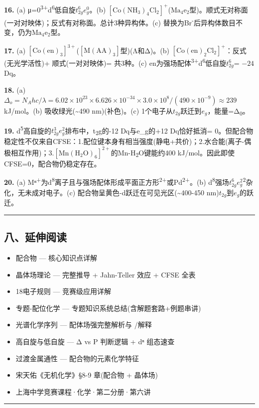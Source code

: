 \textbf{16.} (a) μ=0\textsuperscript{3+}d\textsuperscript{6}低自旋\箭\(t_{2g}^6 e_g^0\)。(b) \(\mathrm{[Co(NH_3)_4Cl_2]^+}\)(\(\mathrm{Ma_4e_2}\)型)。顺式无对称面(一对对映体)；反式有对称面。总计3种异构体。(c) 替换为Br\textsuperscript{-}后异构体数目不变，仍为\(\mathrm{Ma_4e_2}\)型。

\textbf{17.} (a) \(\mathrm{[Co(en)_3]^{3+}}\)(\(\mathrm{[M(AA)_3]}\)型)(Λ和Δ)。(b) \(\mathrm{[Co(en)_2Cl_2]^+}\)：反式(无光学活性)+ 顺式(一对对映体)= 共3种。(c) en为强场配体\textsuperscript{3+}d\textsuperscript{6}低自旋\箭\(t_{2g}^6\) = \(-24\) Dq。

\textbf{18.} (a) \(\Delta_o = N_A hc/\lambda = 6.02 \times 10^{23} \times 6.626 \times 10^{-34} \times 3.0 \times 10^8 / (490 \times 10^{-9}) \approx 239\) kJ/mol。(b) 吸收绿光(\textasciitilde490 nm)(补色)。(c) 1个电子从\(t_{2g}\)跃迁到\(e_g\)，能量=Δ\textsubscript{0}。

\textbf{19.} d\textsuperscript{5}高自旋的\(t_{2g}^3 e_g^2\)排布中，t\textsubscript{2}g的-12 Dq与e\_g的+12 Dq恰好抵消 = 0。但配合物稳定性不仅来自CFSE：1.配位键本身有相当强度(静电+共价)；2.水合能(离子-偶极相互作用)；3.\(\mathrm{[Mn(H_2O)_6]^{2+}}\)的Mn-H\textsubscript{2}O键能约400 kJ/mol。因此即使CFSE=0，配合物仍稳定存在。

\textbf{20.} (a) Mⁿ\textsuperscript{+}为d\textsuperscript{8}离子且与强场配体形成平面正方形\textsuperscript{2+}或Pd\textsuperscript{2+}。(b) d\textsuperscript{8}强场\箭\(t_{2g}^6 e_g^2\)\textsuperscript{2}杂化，无未成对电子。(c) 配合物呈黄色-d跃迁在可见光区(\textasciitilde400-450 nm)\(t_{2g}\)到\(e_g\)的跃迁。

\begin{center}\rule{0.5\linewidth}{0.5pt}\end{center}

\subsection{八、延伸阅读}\label{ux516bux5ef6ux4f38ux9605ux8bfb}

\begin{itemize}
\tightlist
\item
  配合物 --- 核心知识点详解
\item
  晶体场理论 --- 完整推导 + Jahn-Teller 效应 + CFSE 全表
\item
  18电子规则 --- 竞赛级应用详解
\item
  专题-配位化学 --- 专题知识系统总结(含解题套路+例题串讲)
\item
  光谱化学序列 --- 配体场强完整解析与 /\派 解释
\item
  高自旋与低自旋 --- Δ vs P 判断逻辑 + dⁿ 组态速查
\item
  过渡金属通性 --- 配合物的元素化学特征
\item
  宋天佑《无机化学》§8-9 章(配合物 + 晶体场)
\item
  上海中学竞赛课程·化学·第二分册·第六讲
\end{itemize}

\begin{center}\rule{0.5\linewidth}{0.5pt}\end{center}
